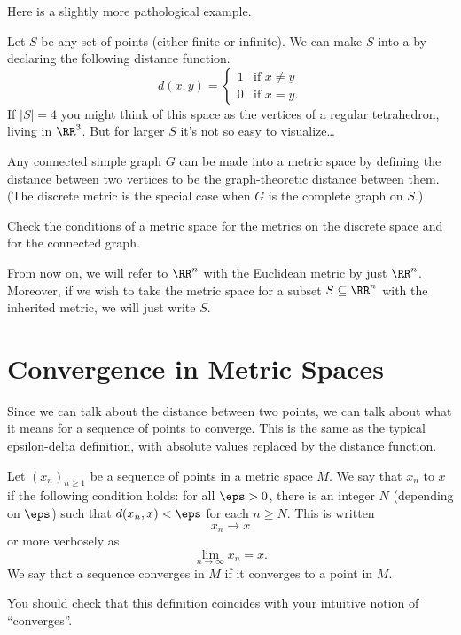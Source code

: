 Here is a slightly more pathological example.
\begin{example}
	Let $S$ be any set of points (either finite or infinite).
	We can make $S$ into a  by declaring the following distance function.
	\[
		d(x,y)
		=
		\begin{cases}
			1 & \text{if $x \neq y$} \\
			0 & \text{if $x = y$}.
		\end{cases}
	\]
	If $\left\lvert S \right\rvert = 4$ you might think of this space
	as the vertices of a regular tetrahedron, living in $\RR^3$.
	But for larger $S$ it's not so easy to visualize\dots
\end{example}
\begin{example}
	Any connected simple graph $G$ can be made into a metric space
	by defining the distance between two vertices to be the
	graph-theoretic distance between them.
	(The discrete metric is the special case when $G$ is the complete graph on $S$.)
\end{example}
\begin{ques}
	Check the conditions of a metric space for the metrics on the discrete space
	and for the connected graph.
\end{ques}

\begin{abuse}
	From now on, we will refer to $\RR^n$ with the Euclidean metric
	by just $\RR^n$.
	Moreover, if we wish to take the metric space for a subset $S \subseteq \RR^n$
	with the inherited metric, we will just write $S$.
\end{abuse}

\section{Convergence in Metric Spaces}

Since we can talk about the distance between two points, we can talk about what it means for a sequence of points to converge.
This is the same as the typical epsilon-delta definition, with absolute values replaced by the distance function.

\begin{definition}
	Let $(x_n)_{n \ge 1}$ be a sequence of points in a metric space $M$.
	We say that $x_n$  to $x$ if the following condition holds:
	for all $\eps > 0$, there is an integer $N$ (depending on $\eps$)
	such that $d(x_n, x) < \eps$ for each $n \ge N$.
	This is written \[ x_n \to x \] or more verbosely as \[ \lim_{n \to \infty} x_n = x. \]
	We say that a sequence converges in $M$ if it converges to a point in $M$.
\end{definition}
You should check that this definition coincides with your intuitive notion of ``converges''.

